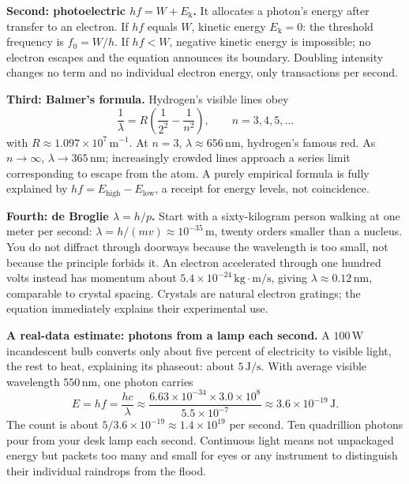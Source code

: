 \textbf{Second: photoelectric \(hf = W + E_{\mathrm{k}}\).} It allocates a photon's energy after transfer to an electron. If \(hf\) equals \(W\), kinetic energy \(E_{\mathrm{k}} = 0\): the threshold frequency is \(f_0 = W/h\). If \(hf < W\), negative kinetic energy is impossible; no electron escapes and the equation announces its boundary. Doubling intensity changes no term and no individual electron energy, only transactions per second.

\textbf{Third: Balmer's formula.} Hydrogen's visible lines obey
\[
\frac{1}{\lambda} = R\left(\frac{1}{2^2} - \frac{1}{n^2}\right), \qquad n = 3, 4, 5, \dots
\]
with \(R \approx 1.097\times10^{7}\,\mathrm{m^{-1}}\). At \(n = 3\), \(\lambda \approx 656\,\mathrm{nm}\), hydrogen's famous red. As \(n \to \infty\), \(\lambda \to 365\,\mathrm{nm}\); increasingly crowded lines approach a series limit corresponding to escape from the atom. A purely empirical formula is fully explained by \(hf = E_{\text{high}} - E_{\text{low}}\), a receipt for energy levels, not coincidence.

\textbf{Fourth: de Broglie \(\lambda = h/p\).} Start with a sixty-kilogram person walking at one meter per second: \(\lambda = h/(mv) \approx 10^{-35}\,\mathrm{m}\), twenty orders smaller than a nucleus. You do not diffract through doorways because the wavelength is too small, not because the principle forbids it. An electron accelerated through one hundred volts instead has momentum about \(5.4\times10^{-24}\,\mathrm{kg\cdot m/s}\), giving \(\lambda \approx 0.12\,\mathrm{nm}\), comparable to crystal spacing. Crystals are natural electron gratings; the equation immediately explains their experimental use.

\textbf{A real-data estimate: photons from a lamp each second.} A \(100\,\mathrm{W}\) incandescent bulb converts only about five percent of electricity to visible light, the rest to heat, explaining its phaseout: about \(5\,\mathrm{J/s}\). With average visible wavelength \(550\,\mathrm{nm}\), one photon carries
\[
E = hf = \frac{hc}{\lambda} \approx \frac{6.63\times10^{-34}\times3.0\times10^{8}}{5.5\times10^{-7}} \approx 3.6\times10^{-19}\,\mathrm{J}.
\]
The count is about \(5 / 3.6\times10^{-19} \approx 1.4\times10^{19}\) per second. Ten quadrillion photons pour from your desk lamp each second. Continuous light means not unpackaged energy but packets too many and small for eyes or any instrument to distinguish their individual raindrops from the flood.

